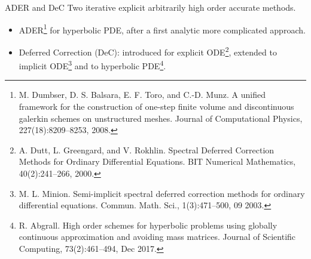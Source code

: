\documentclass[aspectratio=169]{beamer}
\begin{document}
\begin{frame}{ADER and DeC}
Two iterative explicit arbitrarily high order accurate methods.
\begin{itemize}
\item ADER\footnote{M. Dumbser, D. S. Balsara, E. F. Toro, and C.-D. Munz. A unified framework for the construction of one-step finite volume and discontinuous galerkin schemes on unstructured meshes. Journal of Computational Physics, 227(18):8209–8253, 2008.} for hyperbolic PDE, after a first analytic more complicated approach.
\item Deferred Correction (DeC): introduced for explicit ODE\footnote{A. Dutt, L. Greengard, and V. Rokhlin. Spectral Deferred Correction Methods for Ordinary Differential Equations. BIT Numerical Mathematics, 40(2):241–266, 2000.}, extended to implicit ODE\footnote{M. L. Minion. Semi-implicit spectral deferred correction methods for ordinary differential equations. Commun. Math. Sci., 1(3):471–500, 09 2003.} and to hyperbolic PDE\footnote{R. Abgrall. High order schemes for hyperbolic problems using globally continuous approximation and avoiding mass matrices. Journal of Scientific Computing, 73(2):461–494, Dec 2017.}.
\end{itemize}
\end{frame}
\end{document}
